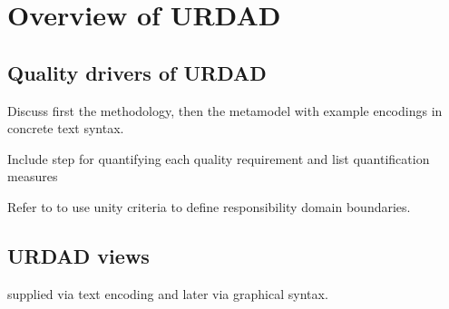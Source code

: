 \section{Overview of URDAD}

\subsection{Quality drivers of URDAD}

Discuss first the methodology, then the metamodel with example encodings in concrete text syntax.

Include step for quantifying each quality requirement and list quantification measures

Refer to \cite{gonzalez_unity_2009} to use unity criteria to define responsibility domain boundaries.

\subsection{URDAD views}

supplied via text encoding and later via graphical syntax.